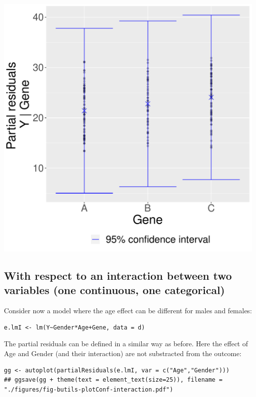 \documentclass[12pt]{article}
\begin{document}
\begin{center}
\includegraphics[width=1\textwidth]{./figures/fig-butils-plotConf-categorical.pdf}
\end{center}

\clearpage

\subsection{With respect to an interaction between two variables (one continuous, one categorical)}
\label{sec:orga871b85}

Consider now a model where the age effect can be different for males
and females:
\lstset{language=r,label= ,caption= ,captionpos=b,numbers=none}
\begin{lstlisting}
e.lmI <- lm(Y~Gender*Age+Gene, data = d)
\end{lstlisting}

The partial residuals can be defined in a similar way as before. Here
the effect of Age and Gender (and their interaction) are not
substracted from the outcome:
\lstset{language=r,label= ,caption= ,captionpos=b,numbers=none}
\begin{lstlisting}
gg <- autoplot(partialResiduals(e.lmI, var = c("Age","Gender")))
## ggsave(gg + theme(text = element_text(size=25)), filename = "./figures/fig-butils-plotConf-interaction.pdf")
\end{lstlisting}
\end{document}
